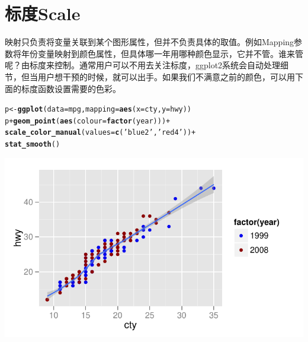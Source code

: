 \documentclass[UTF8,10pt]{ctexart}\usepackage{graphicx, color}
\makeatletter
\def\maxwidth{ %
  \ifdim\Gin@nat@width>\linewidth
    \linewidth
  \else
    \Gin@nat@width
  \fi
}
\newcommand{\hlfunctioncall}[1]{\textcolor[rgb]{0.501960784313725,0,0.329411764705882}{\textbf{#1}}}%
\newcommand{\hlstring}[1]{\textcolor[rgb]{0.6,0.6,1}{#1}}%
\newenvironment{kframe}{%
 \def\at@end@of@kframe{}%
 \ifinner\ifhmode%
  \def\at@end@of@kframe{\end{minipage}}%
  \begin{minipage}{\columnwidth}%
 \fi\fi%
 \def\FrameCommand##1{\hskip\@totalleftmargin \hskip-\fboxsep
 \colorbox{shadecolor}{##1}\hskip-\fboxsep
     \hskip-\linewidth \hskip-\@totalleftmargin \hskip\columnwidth}%
 \MakeFramed {\advance\hsize-\width
   \@totalleftmargin\z@ \linewidth\hsize
   \@setminipage}}%
 {\par\unskip\endMakeFramed%
 \at@end@of@kframe}
\newenvironment{knitrout}{}{} %
\makeatother
\begin{document}
\section{标度Scale}
映射只负责将变量关联到某个图形属性，但并不负责具体的取值。例如Mapping参数将年份变量映射到颜色属性，但具体哪一年用哪种颜色显示，它并不管。谁来管呢？由标度来控制。通常用户可以不用去关注标度，ggplot2系统会自动处理细节，但当用户想干预的时候，就可以出手。如果我们不满意之前的颜色，可以用下面的标度函数设置需要的色彩。
\begin{knitrout}
\color{fgcolor}\begin{kframe}
\begin{alltt}
p <- \hlfunctioncall{ggplot}(data=mpg,mapping=\hlfunctioncall{aes}(x=cty,y=hwy))
p + \hlfunctioncall{geom_point}(\hlfunctioncall{aes}(colour=\hlfunctioncall{factor}(year)))+
    \hlfunctioncall{scale_color_manual}(values =\hlfunctioncall{c}(\hlstring{'blue2'},\hlstring{'red4'}))+
    \hlfunctioncall{stat_smooth}()
\end{alltt}
\end{kframe}

{\centering \includegraphics[width=\maxwidth]{figure/unnamed-chunk-8} 

}


\end{knitrout}
\end{document}
